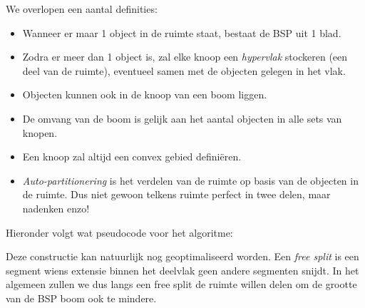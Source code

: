 \documentclass[12pt,a4paper]{article}
\begin{document}
	We overlopen een aantal definities: 
	\begin{itemize}
		\item Wanneer er maar 1 object in de ruimte staat, bestaat de BSP uit 1 blad. 
		\item Zodra er meer dan 1 object is, zal elke knoop een \textit{hypervlak} stockeren (een deel van de ruimte), eventueel samen met de objecten gelegen in het vlak. 
		\item Objecten kunnen ook in de knoop van een boom liggen. 
		\item De omvang van de boom is gelijk aan het aantal objecten in alle sets van knopen. 
		\item Een knoop zal altijd een convex gebied definiëren. 
		\item \textit{Auto-partitionering} is het verdelen van de ruimte op basis van de objecten in de ruimte. Dus niet gewoon telkens ruimte perfect in twee delen, maar nadenken enzo! 
	\end{itemize}
	Hieronder volgt wat pseudocode voor het algoritme: 
	\begin{figure}[H]
		\centering
		\label{fig:BSP-pseudocode}
	\end{figure}
	Deze constructie kan natuurlijk nog geoptimaliseerd worden. Een \textit{free split} is een segment wiens extensie binnen het deelvlak geen andere segmenten snijdt. In het algemeen zullen we dus langs een free split de ruimte willen delen om de grootte van de BSP boom ook te mindere. 
	
\end{document}
